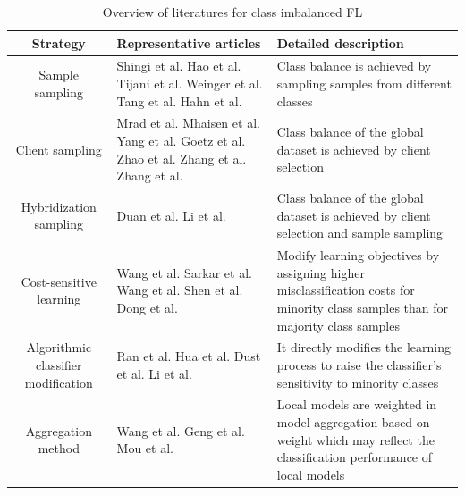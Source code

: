 \documentclass[10pt,journal,compsoc]{IEEEtran}
\begin{document}
	\begin{table}[!t]
		\centering
		\caption{Overview of literatures for class imbalanced FL}	   
		\label{solving methods}    		       	
		\begin{tabular}{cp{5.5cm}p{6cm}}
			\hline
			Strategy& Representative articles&Detailed description \\ 
			\hline
			Sample sampling & Shingi et al. \cite{shingi2020federated} Hao et al. \cite{hao2021towards} Tijani et al. \cite{tijani2021federated}  Weinger et al. \cite{weinger2022enhancing} Tang et al. \cite{tangdata} Hahn et al. \cite{hahn2019privacy}& Class balance is achieved by sampling samples from different classes \\ \hline
			
			Client sampling& Mrad et al. \cite{mrad2021federated} Mhaisen et al. \cite{mhaisen2021optimal} Yang et al. \cite{yang2021federated} Goetz et al. \cite{goetz2019active} Zhao et al. \cite{zhao2020cluster} Zhang et al. \cite{zhang2021dubhe} Zhang et al. \cite{zhang2021fedsens}&Class balance of the global dataset is achieved by client selection \\ \hline
			
			Hybridization sampling&Duan et al. \cite{duan2020self} \cite{duan2019astraea} Li et al. \cite{li2021sample}&Class balance of the global dataset is achieved by client selection and sample sampling\\ \hline
			
			Cost-sensitive learning& Wang et al. \cite{wang2021addressing} Sarkar et al. \cite{sarkar2020fed} Wang et al. \cite{wang2021federated}  Shen et al. \cite{shen2021agnostic} Dong et al. \cite{dong2022federated}&Modify learning objectives by assigning higher misclassification costs for minority class samples than for majority class samples\\ \hline
			
			Algorithmic classifier modification& Ran et al. \cite{ran2021dynamic} Hua et al. \cite{hua2020blockchain} Dust et al. \cite{dust2021federated}  Li et al. \cite{li2021fedrs} & It directly modifies the learning process to raise the classifier's sensitivity to minority classes\\ \hline
			
			Aggregation method& Wang et al. \cite{wang2021adaptive} Geng et al. \cite{geng2022bearing} Mou et al.  \cite{mou2021optimized} &Local models are weighted in model aggregation based on weight which may reflect the classification performance of local models\\  \hline
			

\end{tabular}
\end{table}
\end{document}
